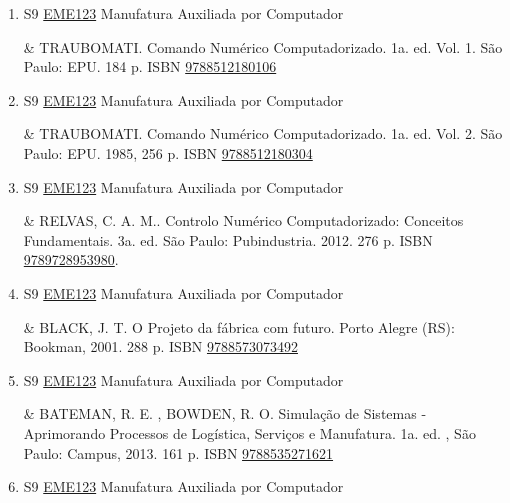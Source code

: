 \documentclass[12pt,a4paper]{book}
\begin{document}
\begin{enumerate}
 \item S9 \hyperref[PUD:EME123]{EME123} Manufatura Auxiliada por Computador

&  TRAUBOMATI.   Comando Numérico Computadorizado.  1a.  ed.  Vol.  1.  São Paulo: EPU.  184 p.  ISBN \href{http://www.bn.br/site/pages/servicosProfissionais/agenciaISBN/isbnBusca/FbnBuscaISBNCatalogo.asp?pField=ISBN&pIntPagina=1&pISBN=12180106&nidbISBN=true&hidbISBN=true}{9788512180106}
 

 \item S9 \hyperref[PUD:EME123]{EME123} Manufatura Auxiliada por Computador

&  TRAUBOMATI.   Comando Numérico Computadorizado.  1a.  ed.  Vol.  2.  São Paulo: EPU.  1985, 256 p.  ISBN \href{http://www.bn.br/site/pages/servicosProfissionais/agenciaISBN/isbnBusca/FbnBuscaISBNCatalogo.asp?pField=ISBN&pIntPagina=1&pISBN=12180304&nidbISBN=true&hidbISBN=true}{9788512180304}
 

 \item S9 \hyperref[PUD:EME123]{EME123} Manufatura Auxiliada por Computador

&  RELVAS, C.  A.  M..  Controlo Numérico Computadorizado: Conceitos Fundamentais.  3a.  ed.  São Paulo: Pubindustria.  2012.  276 p.  ISBN \href{http://www.google.com/search?hl=pt-BR&tbo=p&tbm=bks&q=isbn:9789728953980&num=10}{9789728953980}.
 \item S9 \hyperref[PUD:EME123]{EME123} Manufatura Auxiliada por Computador

&  BLACK, J.  T.  O Projeto da fábrica com futuro.  Porto Alegre (RS): Bookman, 2001.  288 p.  ISBN \href{http://www.bn.br/site/pages/servicosProfissionais/agenciaISBN/isbnBusca/FbnBuscaISBNCatalogo.asp?pField=ISBN&pIntPagina=1&pISBN=73073492&nidbISBN=true&hidbISBN=true}{9788573073492}

 

 \item S9 \hyperref[PUD:EME123]{EME123} Manufatura Auxiliada por Computador

&  BATEMAN, R. E. , BOWDEN, R. O.  Simulação de Sistemas - Aprimorando Processos de Logística, Serviços e Manufatura.  1a. ed. , São Paulo: Campus, 2013.  161 p.  ISBN \href{http://www.bn.br/site/pages/servicosProfissionais/agenciaISBN/isbnBusca/FbnBuscaISBNCatalogo.asp?pField=ISBN&pIntPagina=1&pISBN=35271621&nidbISBN=true&hidbISBN=true}{9788535271621}

 

 \item S9 \hyperref[PUD:EME123]{EME123} Manufatura Auxiliada por Computador


\end{enumerate}
\end{document}
